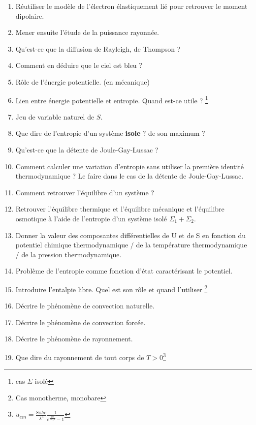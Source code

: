 \documentclass[a4paper, 11pt, hidelinks]{article}
\begin{document}
\begin{enumerate}
    \item Réutiliser le modèle de l'électron élastiquement lié pour retrouver le moment dipolaire. \cite{Chapitre18}
    \item Mener ensuite l'étude de la puissance rayonnée. \cite{Chapitre18}
    \item Qu'est-ce que la diffusion de Rayleigh, de Thompson ? \cite{Chapitre18}
    \item Comment en déduire que le ciel est bleu ? \cite{Chapitre18}
    \item Rôle de l'énergie potentielle. (en mécanique) \cite{Chapitre1bis}
    \item Lien entre énergie potentielle et entropie. Quand est-ce utile ? \footnote{cas $\Sigma$ isolé} \cite{Chapitre1bis}
    \item Jeu de variable naturel de $S$. \cite{Chapitre1bis}
    \item Que dire de l'entropie d'un système \textbf{isole} ? de son maximum ? \cite{Chapitre1bis}
    \item Qu'est-ce que la détente de Joule-Gay-Lussac ? \cite{Chapitre1bis}
    \item Comment calculer une variation d'entropie sans utiliser la première identité thermodynamique ? Le faire dans le cas de la détente de Joule-Gay-Lussac. \cite{Chapitre1bis}
    \item Comment retrouver l'équilibre d'un système ? \cite{Chapitre1bis}
    \item Retrouver l'équilibre thermique et l'équilibre mécanique et l'équilibre osmotique à l'aide de l'entropie d'un système isolé $\Sigma_1 + \Sigma_2$. \cite{Chapitre1bis}
    \item Donner la valeur des composantes différentielles de U et de S en fonction du potentiel chimique thermodynamique / de la température thermodynamique / de la pression thermodynamique. \cite{Chapitre1bis}
    \item Problème de l'entropie comme fonction d'état caractérisant le potentiel. \cite{Chapitre1bis}
    \item Introduire l'entalpie libre. Quel est son rôle et quand l'utiliser \footnote{Cas monotherme, monobare} \cite{Chapitre1bis}
    \item Décrire le phénomène de convection naturelle. \cite{Chapitre20}
    \item Décrire le phénomène de convection forcée. \cite{Chapitre20}
    \item Décrire le phénomène de rayonnement. \cite{Chapitre20}
    \item Que dire du rayonnement de tout corps de $T>0$\footnote{$u_{em}=\frac{8\pi h c }{\lambda^5} \frac{1}{e^{\frac{hc}{\lambda k_b T}}-1}$} \cite{Chapitre20}

\end{enumerate}
\end{document}
